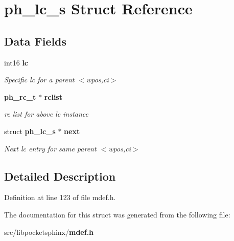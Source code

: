 \section{ph\+\_\+lc\+\_\+s Struct Reference}
\label{structph__lc__s}
\subsection*{Data Fields}
\begin{DoxyCompactItemize}
\item 
int16 {\bf lc}\label{structph__lc__s_adfb4e9553a4e2314543f9f1ef661185e}

\begin{DoxyCompactList}\small\item\em Specific lc for a parent $<$wpos,ci$>$ \end{DoxyCompactList}\item 
{\bf ph\+\_\+rc\+\_\+t} $\ast$ {\bf rclist}\label{structph__lc__s_aac24b848d70d96894c312d16050c4051}

\begin{DoxyCompactList}\small\item\em rc list for above lc instance \end{DoxyCompactList}\item 
struct {\bf ph\+\_\+lc\+\_\+s} $\ast$ {\bf next}\label{structph__lc__s_a5cda7044037678163c2242dde19df13a}

\begin{DoxyCompactList}\small\item\em Next lc entry for same parent $<$wpos,ci$>$ \end{DoxyCompactList}\end{DoxyCompactItemize}


\subsection{Detailed Description}


Definition at line 123 of file mdef.\+h.



The documentation for this struct was generated from the following file\+:\begin{DoxyCompactItemize}
\item 
src/libpocketsphinx/{\bf mdef.\+h}\end{DoxyCompactItemize}
